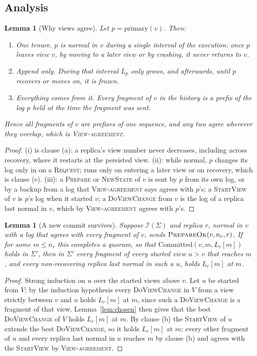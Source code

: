 \documentclass[11pt,a4paper]{article}
\theoremstyle{plain}
\newtheorem{lemma}[theorem]{Lemma}
\theoremstyle{definition}
\theoremstyle{remark}
\newcommand{\msg}[1]{\textsc{#1}}
\newcommand{\dvc}{\msg{DoViewChange}}
\newcommand{\Inv}{\mathcal{I}}
\newcommand{\Committed}{\mathrm{Committed}}
\newcommand{\primary}{\mathrm{primary}}
\newcommand{\OneLog}{\textsc{View-agreement}}
\begin{document}
\subsection{Analysis}

\begin{lemma}[Why views agree]
\label{lem:primary}
Let $p = \primary(v)$. Then:
\begin{enumerate}[nosep,label=(\roman*)]
  \item \emph{One tenure.} $p$ is normal in $v$ during a single interval
    of the execution: once $p$ leaves view $v$, by moving to a later view
    or by crashing, it never returns to $v$.
  \item \emph{Append only.} During that interval $L_p$ only grows, and
    afterwards, until $p$ recovers or moves on, it is frozen.
  \item \emph{Everything comes from it.} Every fragment of $v$ in the
    history is a prefix of the log $p$ held at the time the fragment was
    sent.
\end{enumerate}
Hence all fragments of $v$ are prefixes of one sequence, and any two
agree wherever they overlap, which is \OneLog.
\end{lemma}
\begin{proof}
(i) is clause (a): a replica's view number never decreases, including
across recovery, where it restarts at the persisted view. (ii): while
normal, $p$ changes its log only in  on a \msg{Request};
 runs only on entering a later view or on recovery,
which is clause (e). (iii): a \msg{Prepare} or \msg{NewState} of $v$ is
sent by $p$ from its own log, or by a backup from a log that \OneLog{}
says agrees with $p$'s; a \msg{StartView} of $v$ is $p$'s log when it
started $v$; a \dvc{} from $v$ is the log of a replica last normal in $v$,
which by \OneLog{} agrees with $p$'s.
\end{proof}

\begin{lemma}[A new commit survives]
\label{lem:newcommit}
Suppose $\Inv(\Sigma)$ and replica $r$, normal in $v$ with a log that
agrees with every fragment of $v$, sends $\msg{PrepareOk}(v, n_r, r)$.
If for some $m \le n_r$ this completes a quorum, so that
$\Committed(v, m, L_r[m])$ holds in $\Sigma'$, then in $\Sigma'$ every
fragment of every started view $u > v$ that reaches $m$, and every
non-recovering replica last normal in such a $u$, holds $L_r[m]$ at $m$.
\end{lemma}
\begin{proof}
Strong induction on $u$ over the started views above $v$. Let $u$ be
started from $V$; by the induction hypothesis every \dvc{} in $V$ from
a view strictly between $v$ and $u$ holds $L_r[m]$ at $m$, since such a
\dvc{} is a fragment of that view. Lemma~\ref{lem:chosen} then gives
that the best \dvc{} of $V$ holds $L_r[m]$ at $m$. By clause (b) the
\msg{StartView} of $u$ extends the best \dvc{}, so it holds $L_r[m]$ at
$m$; every other fragment of $u$ and every replica last normal in $u$
reaches $m$ by clause (b) and agrees with the \msg{StartView} by
\OneLog.
\end{proof}
\end{document}
